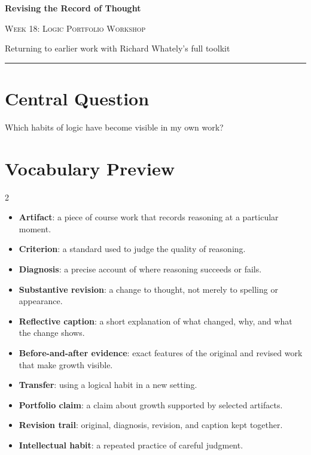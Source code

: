 \documentclass[12pt]{article}
\begin{document}
\begin{center}
{\LARGE\bfseries Revising the Record of Thought}\par\vspace{0.25em}
{\large\scshape Week 18: Logic Portfolio Workshop}\par\vspace{0.5em}
{Returning to earlier work with Richard Whately's full toolkit}\par\vspace{0.6em}
\rule{0.82\textwidth}{0.4pt}
\end{center}

\section*{Central Question}
Which habits of logic have become visible in my own work?

\section*{Vocabulary Preview}
\begin{multicols}{2}
\begin{itemize}[leftmargin=*, itemsep=0.18em]
\item \textbf{Artifact}: a piece of course work that records reasoning at a particular moment.
\item \textbf{Criterion}: a standard used to judge the quality of reasoning.
\item \textbf{Diagnosis}: a precise account of where reasoning succeeds or fails.
\item \textbf{Substantive revision}: a change to thought, not merely to spelling or appearance.
\item \textbf{Reflective caption}: a short explanation of what changed, why, and what the change shows.
\item \textbf{Before-and-after evidence}: exact features of the original and revised work that make growth visible.
\item \textbf{Transfer}: using a logical habit in a new setting.
\item \textbf{Portfolio claim}: a claim about growth supported by selected artifacts.
\item \textbf{Revision trail}: original, diagnosis, revision, and caption kept together.
\item \textbf{Intellectual habit}: a repeated practice of careful judgment.
\end{itemize}
\end{multicols}
\end{document}
